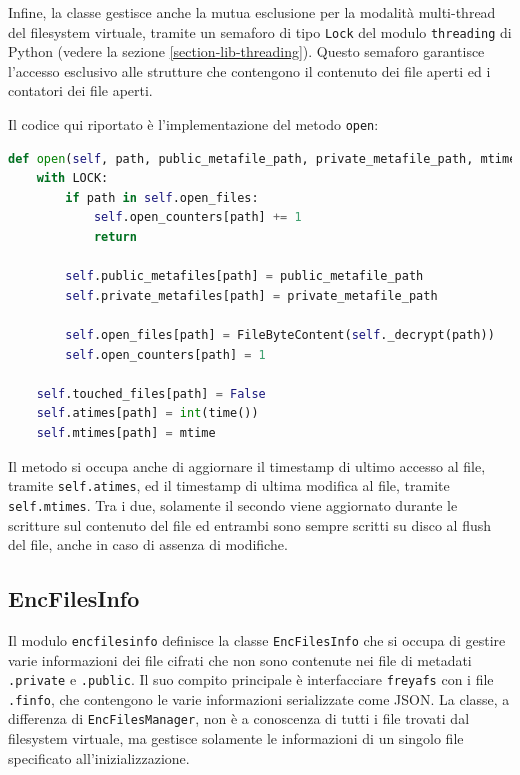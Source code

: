 \documentclass[a4paper,12pt,twoside,openright]{report}
\begin{document}
  Infine, la classe gestisce anche la mutua esclusione per la modalità multi-thread del filesystem virtuale,
  tramite un semaforo di tipo \texttt{Lock} del modulo \texttt{threading} di Python (vedere la sezione \ref{section-lib-threading}).
  Questo semaforo garantisce l'accesso esclusivo alle strutture che contengono il contenuto dei
  file aperti ed i contatori dei file aperti.

  Il codice qui riportato è l'implementazione del metodo \texttt{open}:
  \begin{lstlisting}[language=Python]
  def open(self, path, public_metafile_path, private_metafile_path, mtime):
    with LOCK:
        if path in self.open_files:
            self.open_counters[path] += 1
            return

        self.public_metafiles[path] = public_metafile_path
        self.private_metafiles[path] = private_metafile_path

        self.open_files[path] = FileByteContent(self._decrypt(path))
        self.open_counters[path] = 1
    
    self.touched_files[path] = False
    self.atimes[path] = int(time())
    self.mtimes[path] = mtime
  \end{lstlisting}

  Il metodo si occupa anche di aggiornare il timestamp di ultimo accesso al file,
  tramite \texttt{self.atimes}, ed il timestamp di ultima modifica al file, tramite \texttt{self.mtimes}.
  Tra i due, solamente il secondo viene aggiornato durante le scritture sul contenuto del file
  ed entrambi sono sempre scritti su disco al flush del file, anche in caso di assenza di modifiche.

  \subsection{EncFilesInfo}

  Il modulo \texttt{encfilesinfo} definisce la classe \texttt{EncFilesInfo} che si occupa di gestire varie informazioni dei
  file cifrati che non sono contenute nei file di metadati \texttt{.private} e \texttt{.public}.
  Il suo compito principale è interfacciare \texttt{freyafs} con i file \texttt{.finfo}, che contengono le varie
  informazioni serializzate come JSON.
  La classe, a differenza di \texttt{EncFilesManager}, non è a conoscenza di tutti i file trovati dal filesystem
  virtuale, ma gestisce solamente le informazioni di un singolo file specificato all'inizializzazione.
\end{document}
